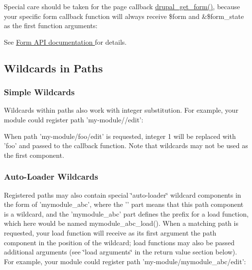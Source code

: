 Special care should be taken for the page callback \hyperlink{group__form__api_ga720df81a837b06dfe19daf1c1eea3437}{drupal\_\-get\_\-form()}, because your specific form callback function will always receive \$form and \&\$form\_\-state as the first function arguments: 
 See \hyperlink{group__form__api}{Form API documentation } for details.\hypertarget{group__hooks_sec_path_wildcards}{}\subsection{Wildcards in Paths}\label{group__hooks_sec_path_wildcards}
\hypertarget{group__hooks_sub_simple_wildcards}{}\subsubsection{Simple Wildcards}\label{group__hooks_sub_simple_wildcards}
Wildcards within paths also work with integer substitution. For example, your module could register path 'my-\/module//edit': 
 When path 'my-\/module/foo/edit' is requested, integer 1 will be replaced with 'foo' and passed to the callback function. Note that wildcards may not be used as the first component.\hypertarget{group__hooks_sub_autoload_wildcards}{}\subsubsection{Auto-\/Loader Wildcards}\label{group__hooks_sub_autoload_wildcards}
Registered paths may also contain special \char`\"{}auto-\/loader\char`\"{} wildcard components in the form of 'mymodule\_\-abc', where the '' part means that this path component is a wildcard, and the 'mymodule\_\-abc' part defines the prefix for a load function, which here would be named mymodule\_\-abc\_\-load(). When a matching path is requested, your load function will receive as its first argument the path component in the position of the wildcard; load functions may also be passed additional arguments (see \char`\"{}load arguments\char`\"{} in the return value section below). For example, your module could register path 'my-\/module/mymodule\_\-abc/edit': 
